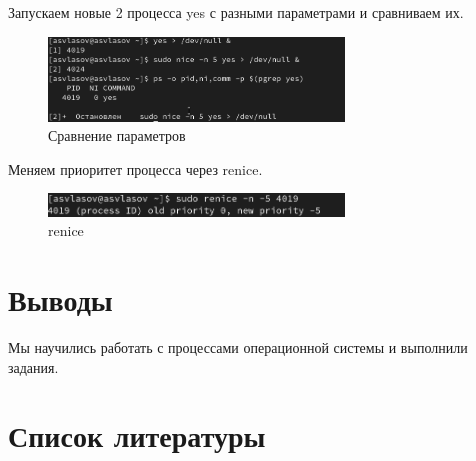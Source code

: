 \documentclass[
  12pt,
  a4paper,
  DIV=11,
  numbers=noendperiod]{scrreprt}
\begin{document}
Запускаем новые 2 процесса yes с разными параметрами и сравниваем их.

\begin{figure}

{\centering \includegraphics[width=0.7\textwidth,height=\textheight]{image/16.png}

}

\caption{Сравнение параметров}

\end{figure}%

Меняем приоритет процесса через renice.

\begin{figure}

{\centering \includegraphics[width=0.7\textwidth,height=\textheight]{image/17.png}

}

\caption{renice}

\end{figure}%

\chapter{Выводы}\label{ux432ux44bux432ux43eux434ux44b}

Мы научились работать с процессами операционной системы и выполнили
задания.

\chapter*{Список
литературы}\label{ux441ux43fux438ux441ux43eux43a-ux43bux438ux442ux435ux440ux430ux442ux443ux440ux44b}

\printbibliography[heading=none]
\end{document}
